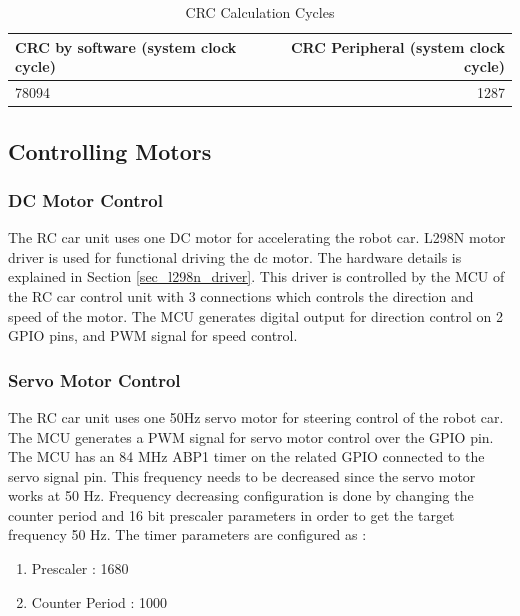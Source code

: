 \begin{table}[!htbp]
    \centering
    \caption{\label{tab:crc_calc_compare}CRC Calculation Cycles}
    \begin{tabular}{l|r}
        CRC by software (system clock cycle) & CRC Peripheral (system clock cycle) \\\hline
        78094 & 1287 \\
    \end{tabular}
\end{table}


\subsection{Controlling Motors} \label{sec_controlling_motors}

\subsubsection{DC Motor Control} \label{sec_dc_motor_control}
The RC car unit uses one DC motor for accelerating the robot car. L298N motor driver is used for functional driving the dc motor. The hardware details is explained in Section \ref{sec_l298n_driver}. This driver is controlled by the MCU of the RC car control unit with 3 connections which controls the direction and speed of the motor. The MCU generates digital output for direction control on 2 GPIO pins, and PWM signal for speed control. \\

\subsubsection{Servo Motor Control} \label{sec_servo_motor_control}
The RC car unit uses one 50Hz servo motor for steering control of the robot car. The MCU generates a PWM signal for servo motor control over the GPIO pin. The MCU has an 84 MHz ABP1 timer on the related GPIO connected to the servo signal pin. This frequency needs to be decreased since the servo motor works at 50 Hz. Frequency decreasing configuration is done by changing the counter period and 16 bit prescaler parameters in order to get the target frequency 50 Hz. The timer parameters are configured as :

\begin{enumerate}
    \item Prescaler : 1680
    \item Counter Period : 1000
\end{enumerate}

